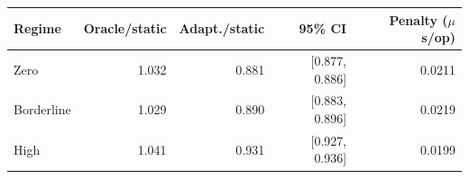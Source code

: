 \begin{tabular}{lrrrr}
\toprule
Regime & Oracle/static & Adapt./static & 95\% CI & Penalty ($\mu$s/op) \\
\midrule
Zero & 1.032 & 0.881 & [0.877, 0.886] & 0.0211 \\
Borderline & 1.029 & 0.890 & [0.883, 0.896] & 0.0219 \\
High & 1.041 & 0.931 & [0.927, 0.936] & 0.0199 \\
\bottomrule
\end{tabular}
